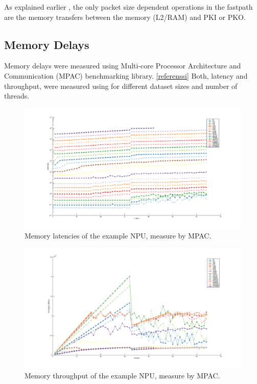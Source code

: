 As explained earlier , the only packet size dependent operations in the fastpath are the  memory transfers between the memory (L2/RAM) and PKI or PKO.

\subsection{Memory Delays}

Memory delays were measured using Multi-core Processor Architecture and Communication (MPAC) benchmarking library. \ref{referenssi} Both, latency and throughput, were measured using for different dataset sizes and number of threads.

\begin{figure}[h]
  \begin{center}
    \includegraphics[width=\textwidth]{images/mem-latency.pdf}
    \caption{Memory latencies of the example NPU, measure by MPAC.}
    \label{fig:mem-latency}
  \end{center}
\end{figure}


\begin{figure}[h]
  \begin{center}
    \includegraphics[width=\textwidth]{images/mem-throughput.pdf}
    \caption{Memory throughput of the example NPU, measure by MPAC.}
    \label{fig:mem-throughput}
  \end{center}
\end{figure}

